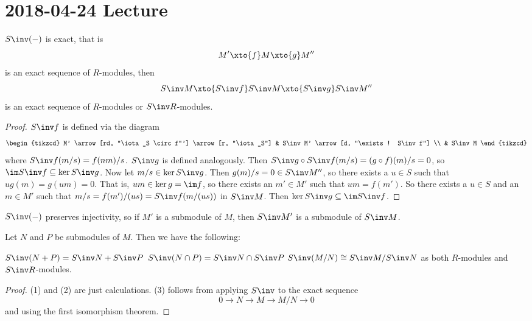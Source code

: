 \section{2018-04-24 Lecture}

\begin{prop}[2.6]
  $S\inv(-)$ is exact, that is
  \[M' \xto{f} M \xto{g} M''\]
  is an exact sequence of $R$-modules, then
  \[S\inv M \xto{S\inv f} S\inv M \xto{S\inv g} S\inv M''\]
  is an exact sequence of $R$-modules or $S\inv R$-modules.
\end{prop}

\begin{proof}
  $S\inv f$ is defined via the diagram
  \[\begin{tikzcd}
    M' \arrow[rd, "\iota_S \circ f"'] \arrow[r, "\iota_S"] & S\inv M' \arrow[d, "\exists ! S\inv f"] \\
     & S\inv M
  \end{tikzcd}\]
  where $S\inv f(m/s) = f(nm)/s$.
  $S\inv g$ is defined analogously.
  Then $S\inv g \circ S\inv f (m/s) = (g \circ f)(m)/s = 0$, so $\im S\inv f \subseteq \ker S\inv g$.
  Now let $m/s \in \ker S\inv g$.
  Then $g(m)/s = 0 \in S\inv M''$, so there exists a $u \in S$ such that $ug(m)=g(um)=0$.
  That is, $um \in \ker g = \im f$, so there exists an $m' \in M'$ such that $um=f(m')$.
  So there exists a $u \in S$ and an $m \in M'$ such that $m/s = f(m')/(us) = S\inv f(m/(us))$ in $S\inv M$.
  Then $\ker S\inv g \subseteq \im S\inv f$.
\end{proof}

\begin{rmk}
  $S\inv(-)$ preserves injectivity, so if $M'$ is a submodule of $M$, then $S\inv M'$ is a submodule of $S\inv M$.
\end{rmk}

\begin{cor}
  Let $N$ and $P$ be submodules of $M$.
  Then we have the following:
  \begin{enum}
    \io $S\inv(N+P)=S\inv N + S\inv P$
    \io $S\inv(N \cap P) = S\inv N \cap S\inv P$
    \io $S\inv(M/N) \cong S\inv M / S\inv N$ as both $R$-modules and $S\inv R$-modules.
  \end{enum}
\end{cor}

\begin{proof}
  (1) and (2) are just calculations.
  (3) follows from applying $S\inv$ to the exact sequence
  \[0 \to N \to M \to M/N \to 0\]
  and using the first isomorphism theorem.
\end{proof}

